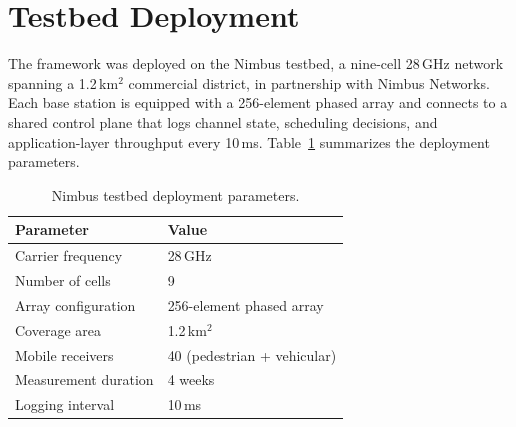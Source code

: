 \section{Testbed Deployment}
The framework was deployed on the Nimbus testbed, a nine-cell 28\,GHz
network spanning a 1.2\,km$^2$ commercial district, in partnership with
Nimbus Networks. Each base station is equipped with a 256-element phased
array and connects to a shared control plane that logs channel state,
scheduling decisions, and application-layer throughput every 10\,ms.
Table~\ref{tab:testbed} summarizes the deployment parameters.

\begin{table}[htbp]
\centering
\caption{Nimbus testbed deployment parameters.}
\label{tab:testbed}
\begin{tabular}{@{}ll@{}}
\toprule
\textbf{Parameter} & \textbf{Value} \\
\midrule
Carrier frequency & 28\,GHz \\
Number of cells & 9 \\
Array configuration & 256-element phased array \\
Coverage area & 1.2\,km$^2$ \\
Mobile receivers & 40 (pedestrian + vehicular) \\
Measurement duration & 4 weeks \\
Logging interval & 10\,ms \\
\bottomrule
\end{tabular}
\end{table}

